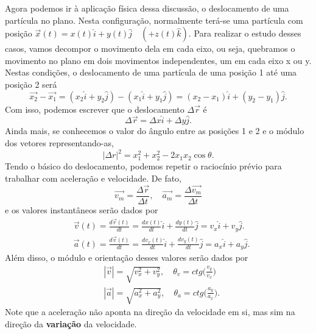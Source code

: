 \documentclass[PhysicsI/physics_notes.tex]{subfiles}
\begin{document}
Agora podemos ir à aplicação física dessa discussão, o deslocamento de uma partícula no plano. Nesta configuração, normalmente
terá-se uma partícula com posição $\vec{x}(t) = x(t)\hat{i} + y(t)\hat{j}\quad (+z(t)\hat{k}).$ Para realizar o estudo desses casos,
vamos decompor o movimento dela em cada eixo, ou seja, quebramos o movimento no plano em dois movimentos independentes, um em cada eixo
x ou y. Nestas condições, o deslocamento de uma partícula de uma posição 1 até uma posição 2 será
$$
	\vec{x_{2}} - \vec{x_{1}} = (x_{2}\hat{i} + y_{2}\hat{j}) - (x_{1}\hat{i}+y_{1}\hat{j}) = (x_{2}-x_{1})\hat{i} + (y_{2}-y_{1})\hat{j}.
$$
Com isso, podemos escrever que o deslocamento $\Delta \vec{r}$ é
$$
	\Delta \vec{r} = \Delta x\hat{i} + \Delta y\hat{j}.
$$
Ainda mais, se conhecemos o valor do ângulo entre as posições 1 e 2 e o módulo dos vetores representando-as,
$$
	|\Delta r|^{2} = x_{1}^{2} + x_{2}^{2} - 2x_{1}x_{2}\cos{\theta}.
$$
Tendo o básico do deslocamento, podemos repetir o raciocínio prévio para trabalhar com aceleração e velocidade. De fato,
$$
	\vec{v_{m}} = \frac{\Delta \vec{r}}{\Delta t}, \quad \vec{a_{m}} = \frac{\Delta \vec{v_{m}}}{\Delta t}
$$
e os valores instantâneos serão dados por
\begin{align*}
	 & \vec{v}(t) = \frac{d \vec{r}(t)}{dt} = \frac{d x(t)}{dt}\hat{i} + \frac{d y(t)}{dt}\hat{j} = v_{x}\hat{i} + v_{y}\hat{j}.         \\
	 & \vec{a}(t) = \frac{d \vec{v}(t)}{dt} = \frac{d v_{x}(t)}{dt}\hat{i} + \frac{d v_{y}(t)}{dt}\hat{j} = a_{x}\hat{i} + a_{y}\hat{j}.
\end{align*}
Além disso, o módulo e orientação desses valores serão dados por
\begin{align*}
	 & |\vec{v}| = \sqrt{v_{x}^{2}+v_{y}^{2}},\quad \theta_{v} = ctg\biggl(\frac{v_{y}}{v_{x}}\biggr)  \\
	 & |\vec{a}| = \sqrt{a_{x}^{2}+a_{y}^{2}},\quad \theta_{a} = ctg\biggl(\frac{a_{y}}{a_{x}}\biggr).
\end{align*}
Note que a aceleração não aponta na direção da velocidade em si, mas sim na direção da \textbf{variação} da velocidade.
\end{document}
